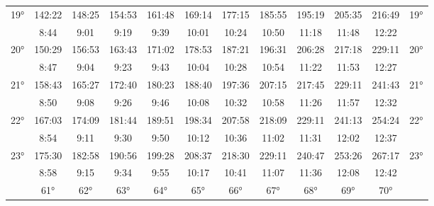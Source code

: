 \begin{scriptsize}
\begin{tabular}{c || c | c | c | c | c | c | c | c | c | c || c}
		\multirow{2}{*}{19°}&142:22&148:25&154:53&161:48&169:14&177:15&185:55&195:19&205:35&216:49&\multirow{2}{*}{19°}\\ \space&8:44&9:01&9:19&9:39&10:01&10:24&10:50&11:18&11:48&12:22&\space\\\hline
		\multirow{2}{*}{20°}&150:29&156:53&163:43&171:02&178:53&187:21&196:31&206:28&217:18&229:11&\multirow{2}{*}{20°}\\ \space&8:47&9:04&9:23&9:43&10:04&10:28&10:54&11:22&11:53&12:27&\space\\\hline
		\multirow{2}{*}{21°}&158:43&165:27&172:40&180:23&188:40&197:36&207:15&217:45&229:11&241:43&\multirow{2}{*}{21°}\\ \space&8:50&9:08&9:26&9:46&10:08&10:32&10:58&11:26&11:57&12:32&\space\\\hline
		\multirow{2}{*}{22°}&167:03&174:09&181:44&189:51&198:34&207:58&218:09&229:11&241:13&254:24&\multirow{2}{*}{22°}\\ \space&8:54&9:11&9:30&9:50&10:12&10:36&11:02&11:31&12:02&12:37&\space\\\hline
		\multirow{2}{*}{23°}&175:30&182:58&190:56&199:28&208:37&218:30&229:11&240:47&253:26&267:17&\multirow{2}{*}{23°}\\ \space&8:58&9:15&9:34&9:55&10:17&10:41&11:07&11:36&12:08&12:42&\space\\\hline
		\hline\space &61°&62°&63°&64°&65°&66°&67°&68°&69°&70°
\end{tabular}\end{scriptsize}


